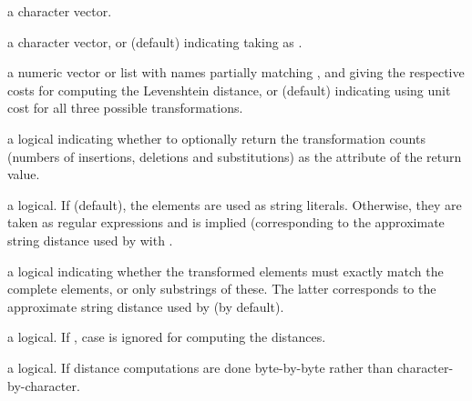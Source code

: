 \begin{Arguments}
\begin{ldescription}
\item[\code{x}] a character vector.
\item[\code{y}] a character vector, or  (default) indicating
taking  as .
\item[\code{costs}] a numeric vector or list with names partially matching
,  and  giving
the respective costs for computing the Levenshtein distance, or
 (default) indicating using unit cost for all three
possible transformations.
\item[\code{counts}] a logical indicating whether to optionally return the
transformation counts (numbers of insertions, deletions and
substitutions) as the  attribute of the return
value.
\item[\code{fixed}] a logical.  If  (default), the 
elements are used as string literals.  Otherwise, they are taken as
regular expressions and  is implied
(corresponding to the approximate string distance used by
 with .
\item[\code{partial}] a logical indicating whether the transformed 
elements must exactly match the complete  elements, or only
substrings of these.  The latter corresponds to the approximate
string distance used by  (by default).
\item[\code{ignore.case}] a logical.  If , case is ignored for
computing the distances.
\item[\code{useBytes}] a logical.  If  distance computations are
done byte-by-byte rather than character-by-character.
\end{ldescription}
\end{Arguments}
%
